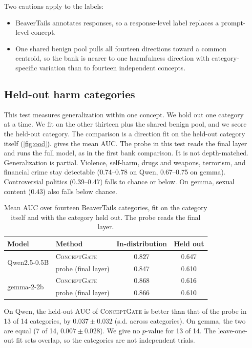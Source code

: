 \documentclass[11pt]{article}
\newcommand{\cg}{\textsc{ConceptGate}}
\begin{document}
Two cautions apply to the labels:
\begin{itemize}[leftmargin=*]
  \item BeaverTails annotates responses, so a response-level label replaces a prompt-level concept.
  \item One shared benign pool pulls all fourteen directions toward a common centroid, so the bank is nearer to one harmfulness direction with category-specific variation than to fourteen independent
    concepts.
\end{itemize}

\subsection{Held-out harm categories}
\label{sec:ood}
This test measures generalization within one concept. We hold out one category at a time. We fit on the
other thirteen plus the shared benign pool, and we score the held-out category. The comparison is a
direction fit on the held-out category itself (\cref{fig:ood}).  gives the mean AUC. The probe in this test reads the final layer and runs the full model, as in the first bank comparison. It is not depth-matched.
Generalization is partial. Violence, self-harm, drugs and weapons, terrorism, and financial crime stay
detectable (0.74--0.78 on Qwen, 0.67--0.75 on gemma). Controversial politics (0.39--0.47) falls to chance
or below. On gemma, sexual content (0.43) also falls below chance.

\begin{table}[h]
\centering
\small
\caption{Mean AUC over fourteen BeaverTails categories, fit on the category itself and with the category held out. The probe reads the final layer.}
\label{tab:oodsummary}
\begin{tabular}{llcc}
\toprule
Model & Method & In-distribution & Held out \\
\midrule
\multirow{2}{*}{Qwen2.5-0.5B} & \cg{} & 0.827 & 0.647 \\ & probe (final layer) & 0.847 & 0.610 \\
\midrule
\multirow{2}{*}{gemma-2-2b} & \cg{} & 0.868 & 0.616 \\ & probe (final layer) & 0.866 & 0.610 \\
\bottomrule
\end{tabular}
\end{table}

On Qwen, the held-out AUC of \cg{} is better than that of the probe in 13 of 14 categories, by
$0.037\pm0.032$ (s.d. across categories). On gemma, the two are equal (7 of 14, $0.007\pm0.028$). We give no
$p$-value for 13 of 14. The leave-one-out fit sets overlap, so the categories are not independent trials.
\end{document}
